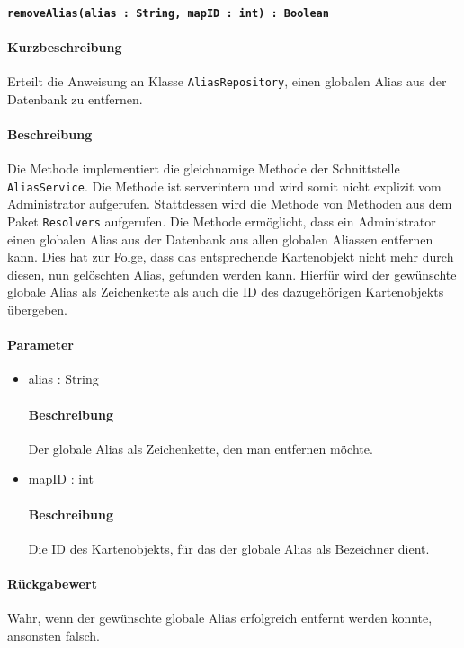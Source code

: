 \paragraph{\texttt{removeAlias(alias : String, mapID : int) : Boolean}}%
\paragraph*{Kurzbeschreibung}
Erteilt die Anweisung an Klasse \texttt{AliasRepository}, einen globalen Alias aus der Datenbank zu entfernen.
\paragraph*{Beschreibung}
Die Methode implementiert die gleichnamige Methode der Schnittstelle \texttt{AliasService}.
Die Methode ist serverintern und wird somit nicht explizit vom Administrator aufgerufen.
Stattdessen wird die Methode von Methoden aus dem Paket \texttt{Resolvers} aufgerufen.
Die Methode ermöglicht, dass ein Administrator einen globalen Alias aus der Datenbank aus allen globalen Aliassen entfernen kann.
Dies hat zur Folge, dass das entsprechende Kartenobjekt nicht mehr durch diesen, nun gelöschten Alias, gefunden werden kann.
Hierfür wird der gewünschte globale Alias als Zeichenkette als auch die ID des dazugehörigen Kartenobjekts übergeben.
\paragraph*{Parameter}
\begin{itemize}
    \item alias : String
    		\paragraph*{Beschreibung}
    		Der globale Alias als Zeichenkette, den man entfernen möchte.
    \item mapID : int
    		\paragraph*{Beschreibung}
    		Die ID des Kartenobjekts, für das der globale Alias als Bezeichner dient.
\end{itemize}
\paragraph*{Rückgabewert}
Wahr, wenn der gewünschte globale Alias erfolgreich entfernt werden konnte, ansonsten falsch.

